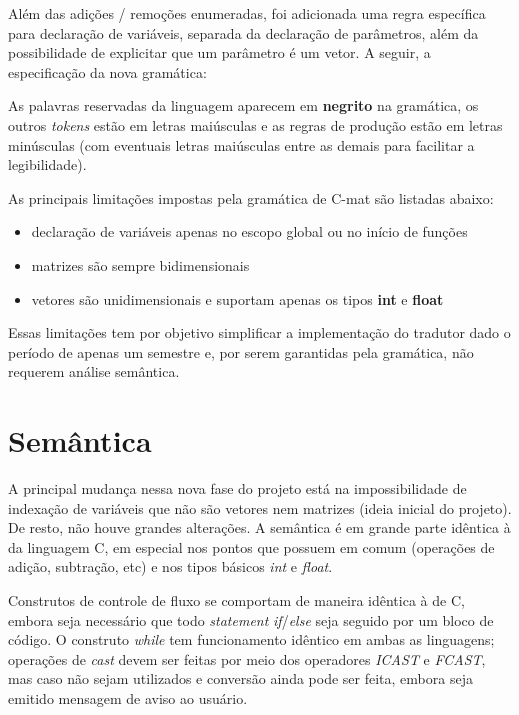 \documentclass[
	article,			%
	11pt,				%
	oneside,			%
	a4paper,			%
	english,			%
	brazil,				%
	sumario=tradicional
	]{abntex2}
\renewcommand{\it}[1]{\textit{#1}}
\renewcommand{\bf}[1]{\textbf{#1}}
\begin{document}
Além das adições / remoções enumeradas, foi adicionada uma regra específica para declaração de variáveis, separada da declaração de parâmetros, além da possibilidade de explicitar que um parâmetro é um vetor.
A seguir, a especificação da nova gramática:
	

As palavras reservadas da linguagem aparecem em \bf{negrito} na gramática, os outros \it{tokens} estão em letras maiúsculas e as regras de produção estão em letras minúsculas (com eventuais letras maiúsculas entre as demais para facilitar a legibilidade).

As principais limitações impostas pela gramática de C-mat são listadas abaixo:
\begin{itemize}
	\item declaração de variáveis apenas no escopo global ou no início de funções
	\item matrizes são sempre bidimensionais
	\item vetores são unidimensionais e suportam apenas os tipos \bf{int} e \bf{float}
\end{itemize}
Essas limitações tem por objetivo simplificar a implementação do tradutor dado o período de apenas um semestre e, por serem garantidas pela gramática, não requerem análise semântica.






\section{Semântica}
A principal mudança nessa nova fase do projeto está na impossibilidade de indexação de variáveis que não são vetores nem matrizes (ideia inicial do projeto). De resto, não houve grandes alterações. A semântica é em grande parte idêntica à da linguagem C, em especial nos pontos que possuem em comum (operações de adição, subtração, etc) e nos tipos básicos \it{int} e \it{float}. 

Construtos de controle de fluxo se comportam de maneira idêntica à de C, embora seja necessário que todo \it{statement} \it{if}/\it{else} seja seguido por um bloco de código. O construto \it{while} tem funcionamento idêntico em ambas as linguagens; operações de \it{cast} devem ser feitas por meio dos operadores \it{ICAST} e \it{FCAST}, mas caso não sejam utilizados e conversão ainda pode ser feita, embora seja emitido mensagem de aviso ao usuário.
\end{document}
